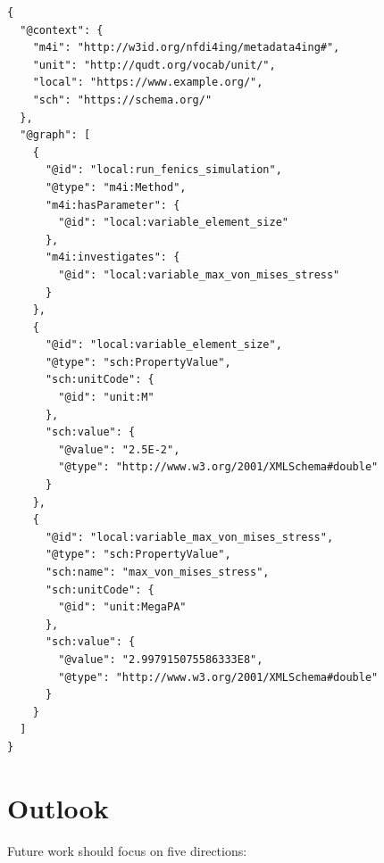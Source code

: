 \begin{lstlisting}[float=htbp,style=json, caption={Deserilaized JSON-LD in Listing~\ref{lst:background_json_example} after the first edit in the \gls{rdf} Panel results in renaming \texttt{schema} prefix and reordering \texttt{@value} and \texttt{@type} fields}, label={lst:conclusion_jsonld_example}]
{
  "@context": {
    "m4i": "http://w3id.org/nfdi4ing/metadata4ing#",
    "unit": "http://qudt.org/vocab/unit/",
    "local": "https://www.example.org/",
    "sch": "https://schema.org/"
  },
  "@graph": [
    {
      "@id": "local:run_fenics_simulation",
      "@type": "m4i:Method",
      "m4i:hasParameter": {
        "@id": "local:variable_element_size"
      },
      "m4i:investigates": {
        "@id": "local:variable_max_von_mises_stress"
      }
    },
    {
      "@id": "local:variable_element_size",
      "@type": "sch:PropertyValue",
      "sch:unitCode": {
        "@id": "unit:M"
      },
      "sch:value": {
        "@value": "2.5E-2",
        "@type": "http://www.w3.org/2001/XMLSchema#double"
      }
    },
    {
      "@id": "local:variable_max_von_mises_stress",
      "@type": "sch:PropertyValue",
      "sch:name": "max_von_mises_stress",
      "sch:unitCode": {
        "@id": "unit:MegaPA"
      },
      "sch:value": {
        "@value": "2.997915075586333E8",
        "@type": "http://www.w3.org/2001/XMLSchema#double"
      }
    }
  ]
}
\end{lstlisting}

\section{Outlook}

Future work should focus on five directions:


